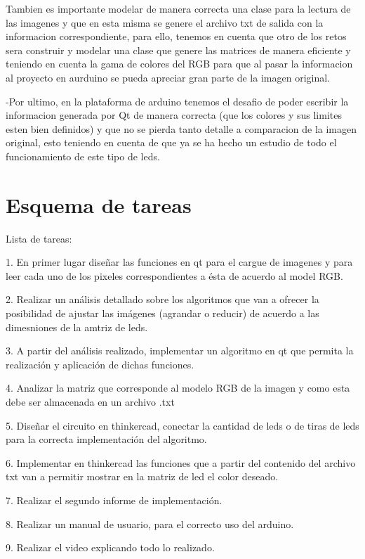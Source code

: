 \documentclass{article}
\begin{document}
Tambien es importante modelar de manera correcta una clase para la lectura de las imagenes y que en esta misma se genere el archivo txt de salida con la informacion correspondiente, para ello, tenemos en cuenta que otro de los retos sera construir y modelar una clase que genere las matrices de manera eficiente y teniendo en cuenta la gama de colores del RGB para que al pasar la informacion al proyecto en aurduino se pueda apreciar gran parte de la imagen original.

-Por ultimo, en la plataforma de arduino tenemos el desafio de poder escribir la informacion generada por Qt de manera correcta (que los colores y sus limites esten bien definidos) y que no se pierda tanto detalle a comparacion de la imagen original, esto teniendo en cuenta de que ya se ha hecho un estudio de todo el funcionamiento de este tipo de leds.


\section{Esquema de tareas} \label{Esquema}

Lista de tareas:

1. En primer lugar diseñar las funciones en qt para el cargue de imagenes y para leer cada uno de los pixeles correspondientes a ésta de acuerdo al model RGB.

2. Realizar un análisis detallado sobre los algoritmos que van a ofrecer la posibilidad de ajustar las imágenes (agrandar o reducir) de acuerdo a las dimesniones de la amtriz de leds.

3. A partir del análisis realizado, implementar un algoritmo en qt que permita la realización y aplicación de dichas funciones.

4. Analizar la matriz que corresponde al modelo RGB de la imagen y como esta debe ser almacenada en un archivo .txt

5. Diseñar el circuito en thinkercad, conectar la cantidad de leds o de tiras de leds para la correcta implementación del algoritmo.

6. Implementar en thinkercad las funciones que a partir del contenido del archivo txt van a permitir mostrar en la matriz de led el color deseado.

7. Realizar el segundo informe de implementación.

8. Realizar un manual de usuario, para el correcto uso del arduino.

9. Realizar el video explicando todo lo realizado.
\end{document}
